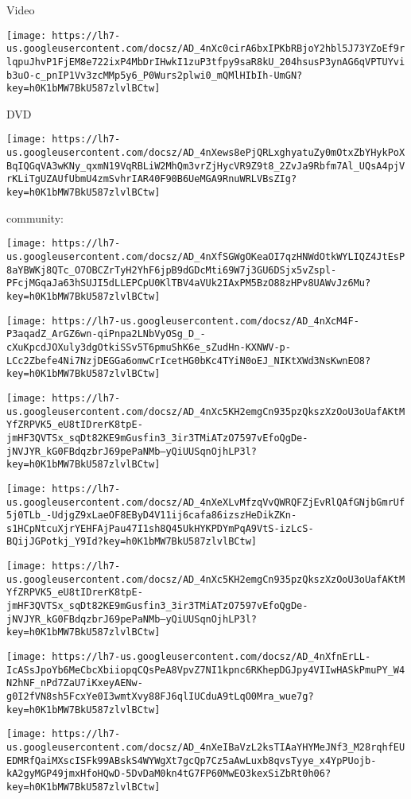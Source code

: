 \documentclass[
]{article}
\begin{document}
Video

\texttt{[image: https://lh7-us.googleusercontent.com/docsz/AD\_4nXc0cirA6bxIPKbRBjoY2hbl5J73YZoEf9rlqpuJhvP1FjEM8e722ixP4MbDrIHwkI1zuP3tfpy9saR8kU\_204hsusP3ynAG6qVPTUYvib3uO-c\_pnIP1Vv3zcMMp5y6\_P0Wurs2plwi0\_mQMlHIbIh-UmGN?key=h0K1bMW7BkU587zlvlBCtw]}

DVD

\texttt{[image: https://lh7-us.googleusercontent.com/docsz/AD\_4nXews8ePjQRLxghyatuZy0mOtxZbYHykPoXBqIQGqVA3wKNy\_qxmN19VqRBLiW2MhQm3vrZjHycVR9Z9t8\_2ZvJa9Rbfm7Al\_UQsA4pjVrKLiTgUZAUfUbmU4zmSvhrIAR40F90B6UeMGA9RnuWRLVBsZIg?key=h0K1bMW7BkU587zlvlBCtw]}

community:

\texttt{[image: https://lh7-us.googleusercontent.com/docsz/AD\_4nXfSGWgOKeaOI7qzHNWdOtkWYLIQZ4JtEsP8aYBWKj8QTc\_O7OBCZrTyH2YhF6jpB9dGDcMti69W7j3GU6DSjx5vZspl-PFcjMGqaJa63hSUJI5dLLEPCpU0KlTBV4aVUk2IAxPM5BzO88zHPv8UAWvJz6Mu?key=h0K1bMW7BkU587zlvlBCtw]}

\texttt{[image: https://lh7-us.googleusercontent.com/docsz/AD\_4nXcM4F-P3aqadZ\_ArGZ6wn-qiPnpa2LNbVyOSg\_D\_-cXuKpcdJOXuly3dgOtkiSSv5T6pmuShK6e\_sZudHn-KXNWV-p-LCc2Zbefe4Ni7NzjDEGGa6omwCrIcetHG0bKc4TYiN0oEJ\_NIKtXWd3NsKwnEO8?key=h0K1bMW7BkU587zlvlBCtw]}

\texttt{[image: https://lh7-us.googleusercontent.com/docsz/AD\_4nXc5KH2emgCn935pzQkszXzOoU3oUafAKtMYfZRPVK5\_eU8tIDrerK8tpE-jmHF3QVTSx\_sqDt82KE9mGusfin3\_3ir3TMiATzO7597vEfoQgDe-jNVJYR\_kG0FBdqzbrJ69pePaNMb--yQiUUSqnOjhLP3l?key=h0K1bMW7BkU587zlvlBCtw]}

\texttt{[image: https://lh7-us.googleusercontent.com/docsz/AD\_4nXeXLvMfzqVvQWRQFZjEvRlQAfGNjbGmrUf5j0TLb\_-UdjgZ9xLaeOF8EByD4V11ij6cafa86izszHeDikZKn-s1HCpNtcuXjrYEHFAjPau47I1sh8Q45UkHYKPDYmPqA9VtS-izLcS-BQijJGPotkj\_Y9Id?key=h0K1bMW7BkU587zlvlBCtw]}

\texttt{[image: https://lh7-us.googleusercontent.com/docsz/AD\_4nXc5KH2emgCn935pzQkszXzOoU3oUafAKtMYfZRPVK5\_eU8tIDrerK8tpE-jmHF3QVTSx\_sqDt82KE9mGusfin3\_3ir3TMiATzO7597vEfoQgDe-jNVJYR\_kG0FBdqzbrJ69pePaNMb--yQiUUSqnOjhLP3l?key=h0K1bMW7BkU587zlvlBCtw]}

\texttt{[image: https://lh7-us.googleusercontent.com/docsz/AD\_4nXfnErLL-IcASsJpoYb6MeCbcXbiiopqCQsPeA8VpvZ7NI1kpnc6RKhepDGJpy4VIIwHASkPmuPY\_W4N2hNF\_nPd7ZaU7iKxeyAENw-g0I2fVN8sh5FcxYe0I3wmtXvy88FJ6qlIUCduA9tLqO0Mra\_wue7g?key=h0K1bMW7BkU587zlvlBCtw]}

\texttt{[image: https://lh7-us.googleusercontent.com/docsz/AD\_4nXeIBaVzL2ksTIAaYHYMeJNf3\_M28rqhfEUEDMRfQaiMXscISFk99ABskS4WYWgXt7gcQp7Cz5aAwLuxb8qvsTyye\_x4YpPUojb-kA2gyMGP49jmxHfoHQwD-5DvDaM0kn4tG7FP60MwEO3kexSiZbRt0h06?key=h0K1bMW7BkU587zlvlBCtw]}
\end{document}
